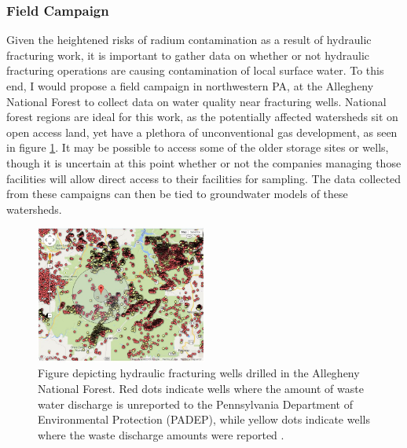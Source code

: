 \documentclass[twoside,12pt,titlepage]{article}
\begin{document}
\subsubsection{Field Campaign}
\label{sec:RaField}
Given the heightened risks of radium contamination as a result of hydraulic fracturing work, it is important to gather data on whether or not hydraulic fracturing operations are causing contamination of local surface water. To this end, I would propose a field campaign in northwestern PA, at the Allegheny National Forest to collect data on water quality near fracturing wells. National forest regions are ideal for this work, as the potentially affected watersheds sit on open access land, yet have a plethora of unconventional gas development, as seen in figure \ref{fig:NationalForest}. It may be possible to access some of the older storage sites or wells, though it is uncertain at this point whether or not the companies managing those facilities will allow direct access to their facilities for sampling. The data collected from these campaigns can then be tied to groundwater models of these watersheds.

\begin{figure}
	\centering
	\includegraphics[width=0.5\textwidth]{AlleghenyForestFrackingWells.jpg}
	\caption{Figure depicting hydraulic fracturing wells drilled in the Allegheny National Forest. Red dots indicate wells where the amount of waste water discharge is unreported to the Pennsylvania Department of Environmental Protection (PADEP), while yellow dots indicate wells where the waste discharge amounts were reported \cite{NRDCFrackingMap}.}
	\label{fig:NationalForest}
\end{figure}
\end{document}

